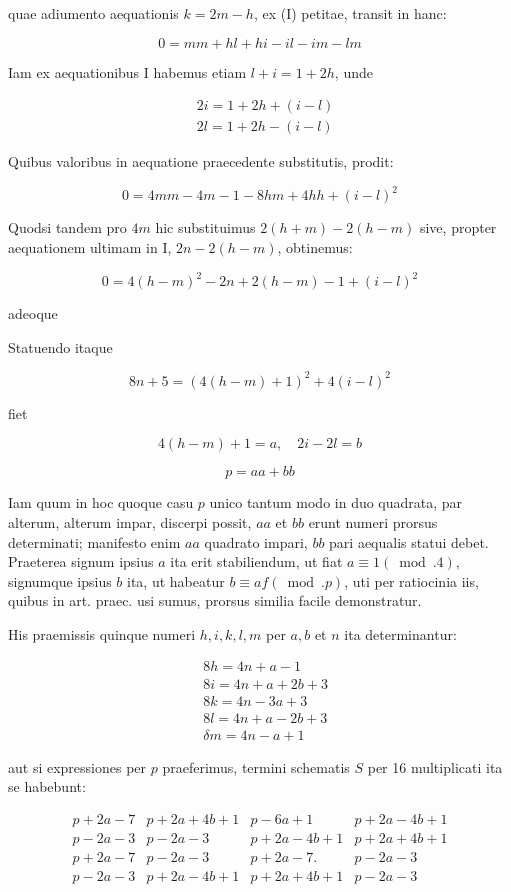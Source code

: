 \documentclass[10pt]{article}
\begin{document}
quae adiumento aequationis \(k=2 m-h\), ex (I) petitae, transit in hanc:

\[
0=m m+h l+h i-i l-i m-l m
\]

Iam ex aequationibus I habemus etiam \(l+i=1+2 h\), unde

\[
\begin{aligned}
& 2 i=1+2 h+(i-l) \\
& 2 l=1+2 h-(i-l)
\end{aligned}
\]

Quibus valoribus in aequatione praecedente substitutis, prodit:

\[
0=4 m m-4 m-1-8 h m+4 h h+(i-l)^{2}
\]

Quodsi tandem pro \(4 m\) hic substituimus \(2(h+m)-2(h-m)\) sive, propter aequationem ultimam in I, \(2 n-2(h-m)\), obtinemus:

\[
0=4(h-m)^{2}-2 n+2(h-m)-1+(i-l)^{2}
\]

adeoque

Statuendo itaque

\[
8 n+5=(4(h-m)+1)^{2}+4(i-l)^{2}
\]

fiet

\[
4(h-m)+1=a, \quad 2 i-2 l=b
\]

\[
p=a a+b b
\]

Iam quum in hoc quoque casu \(p\) unico tantum modo in duo quadrata, par alterum, alterum impar, discerpi possit, \(a a\) et \(b b\) erunt numeri prorsus determinati; manifesto enim \(a a\) quadrato impari, \(b b\) pari aequalis statui debet. Praeterea signum ipsius \(a\) ita erit stabiliendum, ut fiat \(a \equiv 1(\bmod .4)\), signumque ipsius \(b\) ita, ut habeatur \(b \equiv a f(\bmod . p)\), uti per ratiocinia iis, quibus in art. praec. usi sumus, prorsus similia facile demonstratur.

His praemissis quinque numeri \(h, i, k, l, m\) per \(a, b\) et \(n\) ita determinantur:

\[
\begin{aligned}
& 8 h=4 n+a-1 \\
& 8 i=4 n+a+2 b+3 \\
& 8 k=4 n-3 a+3 \\
& 8 l=4 n+a-2 b+3 \\
& \delta m=4 n-a+1
\end{aligned}
\]

aut si expressiones per \(p\) praeferimus, termini schematis \(S\) per 16 multiplicati ita se habebunt:

\[
\begin{array}{l|l|l|l}
p+2 a-7 & p+2 a+4 b+1 & p-6 a+1 & p+2 a-4 b+1 \\
p-2 a-3 & p-2 a-3 & p+2 a-4 b+1 & p+2 a+4 b+1 \\
p+2 a-7 & p-2 a-3 & p+2 a-7 . & p-2 a-3 \\
p-2 a-3 & p+2 a-4 b+1 & p+2 a+4 b+1 & p-2 a-3
\end{array}
\]
\end{document}
